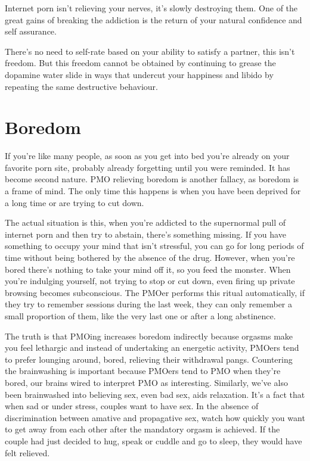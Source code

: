 \documentclass[easypeasy.tex]{subfiles}
\begin{document}
Internet porn isn't relieving your nerves, it's slowly destroying them. One of the great gains of breaking the addiction is the return of your natural confidence and self assurance.

There's no need to self-rate based on your ability to satisfy a partner, this isn't freedom. But this freedom cannot be obtained by continuing to grease the dopamine water slide in ways that undercut your happiness and libido by repeating the same destructive behaviour.

\section{Boredom}

If you're like many people, as soon as you get into bed you're already on your favorite porn site, probably already forgetting until you were reminded. It has become second nature. PMO relieving boredom is another fallacy, as boredom is a frame of mind. The only time this happens is when you have been deprived for a long time or are trying to cut down.

The actual situation is this, when you're addicted to the supernormal pull of internet porn and then try to abstain, there's something missing. If you have something to occupy your mind that isn't stressful, you can go for long periods of time without being bothered by the absence of the drug. However, when you're bored there's nothing to take your mind off it, so you feed the monster. When you're indulging yourself, not trying to stop or cut down, even firing up private browsing becomes subconscious. The PMOer performs this ritual automatically, if they try to remember sessions during the last week, they can only remember a small proportion of them, like the very last one or after a long abstinence.

The truth is that PMOing increases boredom indirectly because orgasms make you feel lethargic and instead of undertaking an energetic activity, PMOers tend to prefer lounging around, bored, relieving their withdrawal pangs. Countering the brainwashing is important because PMOers tend to PMO when they're bored, our brains wired to interpret PMO as interesting. Similarly, we've also been brainwashed into believing sex, even bad sex, aids relaxation. It's a fact that when sad or under stress, couples want to have sex. In the absence of discrimination between amative and propagative sex, watch how quickly you want to get away from each other after the mandatory orgasm is achieved. If the couple had just decided to hug, speak or cuddle and go to sleep, they would have felt relieved.
\end{document}
